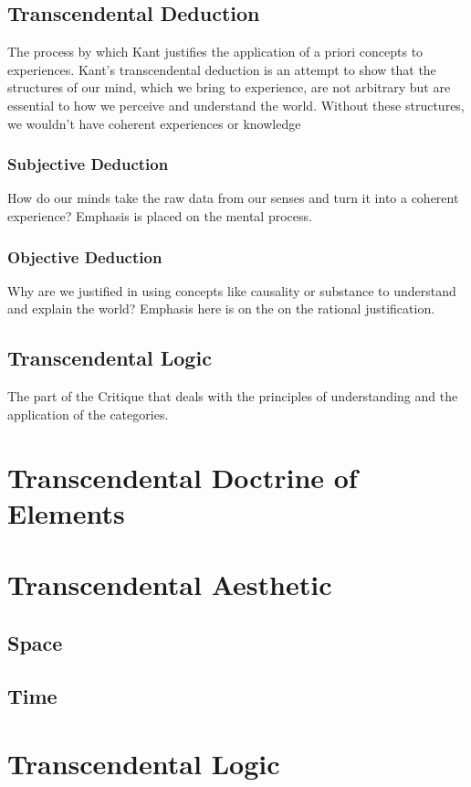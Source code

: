 \documentclass[a4paper]{article}
\begin{document}
\subsection{Transcendental Deduction}
The process by which Kant justifies the application of a priori concepts to experiences.
Kant's transcendental deduction is an attempt to show that the structures of our mind, which we bring to experience, are not arbitrary but are essential to how we perceive and understand the world. 
Without these structures, we wouldn't have coherent experiences or knowledge

\subsubsection{Subjective Deduction}
How do our minds take the raw data from our senses and turn it into a coherent experience? 
Emphasis is placed on the mental process.

\subsubsection{Objective Deduction}
Why are we justified in using concepts like causality or substance to understand and explain the world? 
Emphasis here is on the on the rational justification.


\subsection{Transcendental Logic}
The part of the Critique that deals with the principles of understanding and the application of the categories.


\section{Transcendental Doctrine of Elements}
\section{Transcendental Aesthetic}
\subsection{Space}
\subsection{Time}

\section{Transcendental Logic}
\end{document}
